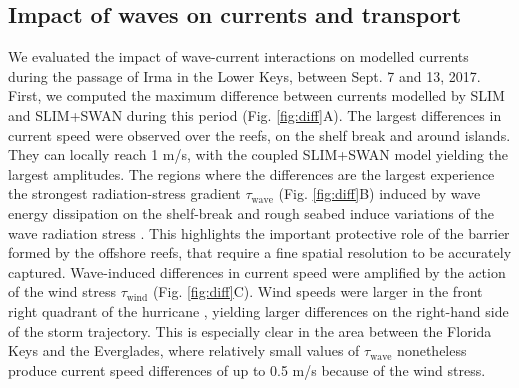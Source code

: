 \documentclass[preprint,12pt,authoryear]{elsarticle}
\begin{document}
\subsection{Impact of waves on currents and transport}

We evaluated the impact of wave-current interactions on modelled currents during the passage of Irma in the Lower Keys, between Sept. 7 and 13, 2017. First, we computed the maximum difference between currents modelled by SLIM and SLIM+SWAN during this period (Fig. \ref{fig:diff}A). The largest differences in current speed were observed over the reefs, on the shelf break and around islands. They can locally reach 1 m/s, with the coupled SLIM+SWAN model yielding the largest amplitudes. The regions where the differences are the largest experience the strongest radiation-stress gradient {\boldmath$\tau$}$_\text{wave}$ (Fig. \ref{fig:diff}B) induced by wave energy dissipation on the shelf-break and rough seabed induce variations of the wave radiation stress \citep{longuet1964radiation}. This highlights the important protective role of the barrier formed by the offshore reefs, that require a fine spatial resolution to be accurately captured. Wave-induced differences in current speed were amplified by the action of the wind stress {\boldmath$\tau$}$_\text{wind}$ (Fig. \ref{fig:diff}C). Wind speeds were larger in the front right quadrant of the hurricane \citep{zedler2009ocean}, yielding larger differences on the right-hand side of the storm trajectory. This is especially clear in the area between the Florida Keys and the Everglades, where relatively small values of {\boldmath$\tau$}$_\text{wave}$ nonetheless produce current speed differences of up to 0.5 m/s because of the wind stress.
\end{document}
